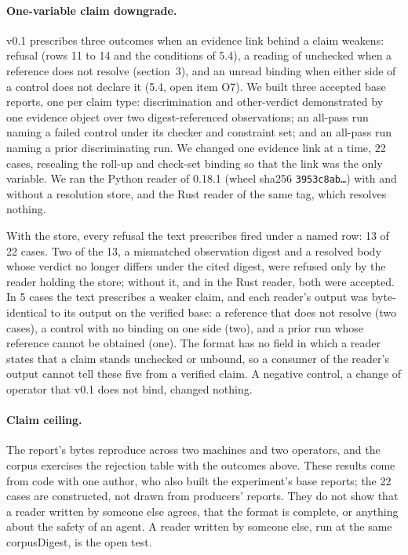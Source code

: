 \paragraph{One-variable claim downgrade.}
v0.1 prescribes three outcomes when an evidence link behind a claim weakens:
refusal (rows 11 to 14 and the conditions of 5.4), a reading of unchecked when a
reference does not resolve (section~3), and an unread binding when either side
of a control does not declare it (5.4, open item O7). We built three accepted
base reports, one per claim type: discrimination and other-verdict demonstrated
by one evidence object over two digest-referenced observations; an all-pass run
naming a failed control under its checker and constraint set; and an all-pass
run naming a prior discriminating run. We changed one evidence link at a time,
22 cases, resealing the roll-up and check-set binding so that the link was the
only variable. We ran the Python reader of 0.18.1 (wheel sha256
\texttt{3953c8ab\ldots}) with and without a resolution store, and the Rust reader
of the same tag, which resolves nothing.

With the store, every refusal the text prescribes fired under a named row: 13 of
22 cases. Two of the 13, a mismatched observation digest and a resolved body
whose verdict no longer differs under the cited digest, were refused only by the
reader holding the store; without it, and in the Rust reader, both were accepted.
In 5 cases the text prescribes a weaker claim, and each reader's output was
byte-identical to its output on the verified base: a reference that does not
resolve (two cases), a control with no binding on one side (two), and a prior run
whose reference cannot be obtained (one). The format has no field in which a
reader states that a claim stands unchecked or unbound, so a consumer of the
reader's output cannot tell these five from a verified claim. A negative control,
a change of operator that v0.1 does not bind, changed nothing.

\paragraph{Claim ceiling.}
The report's bytes reproduce across two machines and two operators, and the
corpus exercises the rejection table with the outcomes above. These results come
from code with one author, who also built the experiment's base reports; the 22
cases are constructed, not drawn from producers' reports. They do not show that a
reader written by someone else agrees, that the format is complete, or anything
about the safety of an agent. A reader written by someone else, run at the same
corpusDigest, is the open test.
